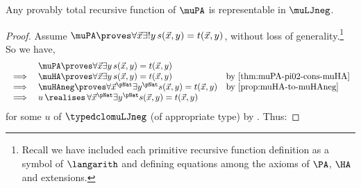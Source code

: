\begin{corollary}
    Any provably total recursive function of $\muPA$ is representable in $\muLJneg$.
\end{corollary}
\begin{proof}
    Assume $\muPA \proves \forall \vec x \exists ! y \, s(\vec x, y) = t(\vec x, y)$, without loss of generality.\footnote{Recall we have included each primitive recursive function definition as a symbol of $\langarith$ and defining equations among the axioms of $\PA$, $\HA$ and extensions.} 
    So we have,
    \[
    \begin{array}{rll}
          & \muPA \proves \forall \vec x \exists  y \, s(\vec x,y) = t(\vec x,y) \\
          \implies & \muHA \proves \forall \vec x \exists  y \, s(\vec x,y) = t(\vec x,y) & \text{by \Cref{thm:muPA-pi02-cons-muHA}} \\
           \implies  & \muHAneg \proves \forall \vec x^\pNat \exists y^\pNat s(\vec x,y) = t(\vec x,y) & \text{by \Cref{prop:muHA-to-muHAneg}} \\
          \implies  &  u\, \realises\,  \forall \vec x^\pNat \exists y^\pNat s(\vec x,y) = t(\vec x,y) 
        \end{array}
          \]
          for some $u$ of $ \typedclomuLJneg$ (of appropriate type) by .
                    Thus:

\end{proof}

